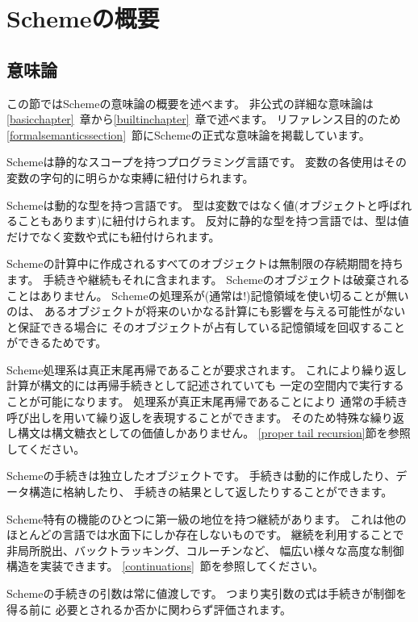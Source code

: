 
\chapter{Schemeの概要}

\section{意味論}
\label{semanticsection}

この節ではSchemeの意味論の概要を述べます。
非公式の詳細な意味論は\ref{basicchapter}~章から\ref{builtinchapter}~章で述べます。
リファレンス目的のため
\ref{formalsemanticssection}~節にSchemeの正式な意味論を掲載しています。

\vest Schemeは静的なスコープを持つプログラミング言語です。
変数の各使用はその変数の字句的に明らかな束縛に紐付けられます。

\vest Schemeは動的な型を持つ言語です。
型は変数ではなく値(オブジェクトと呼ばれることもあります)に紐付けられます。
反対に静的な型を持つ言語では、型は値だけでなく変数や式にも紐付けられます。

\vest Schemeの計算中に作成されるすべてのオブジェクトは無制限の存続期間を持ちます。
手続きや継続もそれに含まれます。
Schemeのオブジェクトは破棄されることはありません。
Schemeの処理系が(通常は!)記憶領域を使い切ることが無いのは、
あるオブジェクトが将来のいかなる計算にも影響を与える可能性がないと保証できる場合に
そのオブジェクトが占有している記憶領域を回収することができるためです。

\vest Scheme処理系は真正末尾再帰であることが要求されます。
これにより繰り返し計算が構文的には再帰手続きとして記述されていても
一定の空間内で実行することが可能になります。
処理系が真正末尾再帰であることにより
通常の手続き呼び出しを用いて繰り返しを表現することができます。
そのため特殊な繰り返し構文は構文糖衣としての価値しかありません。
\ref{proper tail recursion}節を参照してください。

\vest Schemeの手続きは独立したオブジェクトです。
手続きは動的に作成したり、データ構造に格納したり、
手続きの結果として返したりすることができます。

\vest Scheme特有の機能のひとつに第一級の地位を持つ継続があります。
これは他のほとんどの言語では水面下にしか存在しないものです。
継続を利用することで非局所脱出、バックトラッキング、コルーチンなど、
幅広い様々な高度な制御構造を実装できます。
\ref{continuations}~節を参照してください。

\vest Schemeの手続きの引数は常に値渡しです。
つまり実引数の式は手続きが制御を得る前に
必要とされるか否かに関わらず評価されます。

